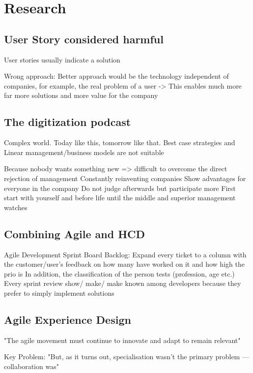 \section*{Research}

\subsection{User Story considered harmful}
User stories usually indicate a solution

Wrong approach:
Better approach would be the technology independent of companies, for example, the real problem of a user -> This enables much more far more solutions and more value for the company
\citep{userstor59:online}

\subsection{The digitization podcast}
Complex world.
Today like this, tomorrow like that.
Best case strategies and
Linear management/business models are not suitable

Because nobody wants something new => difficult to overcome the direct rejection of management
Constantly reinventing companies
Show advantages for everyone in the company
Do not judge afterwards but participate more
First start with yourself and before life until the middle and superior management watches


\subsection{Combining Agile and HCD}
Agile Development Sprint Board Backlog:
Expand every ticket to a column with the customer/user's feedback on how many have worked on it and how high the prio is
In addition, the classification of the person tests (profession, age etc.)
Every sprint review show/ make/ make known among developers because they prefer to simply implement solutions
\citep{nakao2014using}

\subsection{Agile Experience Design}
"The agile movement must continue to innovate and adapt to remain relevant" \citep{ratcliffe2011agile:fw}

Key Problem: "But, as it turns out, specialisation wasn't the primary problem — collaboration was" \citep{ratcliffe2011agile:fw}

